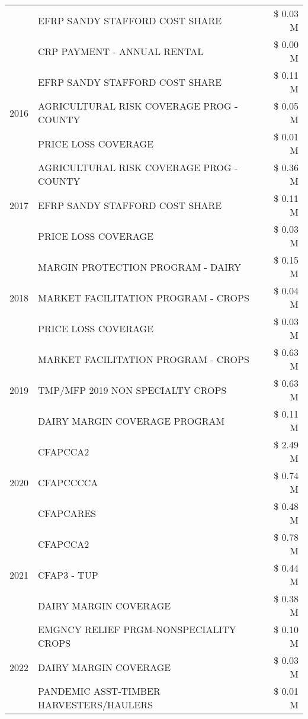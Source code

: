 \begin{tabular}{llr}
 & EFRP SANDY STAFFORD COST SHARE & \$ 0.03 M \\
 & CRP PAYMENT - ANNUAL RENTAL & \$ 0.00 M \\
\cline{1-3}
\multirow[t]{3}{*}{2016} & EFRP SANDY STAFFORD COST SHARE & \$ 0.11 M \\
 & AGRICULTURAL RISK COVERAGE PROG - COUNTY & \$ 0.05 M \\
 & PRICE LOSS COVERAGE & \$ 0.01 M \\
\cline{1-3}
\multirow[t]{3}{*}{2017} & AGRICULTURAL RISK COVERAGE PROG - COUNTY & \$ 0.36 M \\
 & EFRP SANDY STAFFORD COST SHARE & \$ 0.11 M \\
 & PRICE LOSS COVERAGE & \$ 0.03 M \\
\cline{1-3}
\multirow[t]{3}{*}{2018} & MARGIN PROTECTION PROGRAM - DAIRY & \$ 0.15 M \\
 & MARKET FACILITATION PROGRAM - CROPS & \$ 0.04 M \\
 & PRICE LOSS COVERAGE & \$ 0.03 M \\
\cline{1-3}
\multirow[t]{3}{*}{2019} & MARKET FACILITATION PROGRAM - CROPS & \$ 0.63 M \\
 & TMP/MFP 2019 NON SPECIALTY CROPS & \$ 0.63 M \\
 & DAIRY MARGIN COVERAGE PROGRAM & \$ 0.11 M \\
\cline{1-3}
\multirow[t]{3}{*}{2020} & CFAPCCA2 & \$ 2.49 M \\
 & CFAPCCCCA & \$ 0.74 M \\
 & CFAPCARES & \$ 0.48 M \\
\cline{1-3}
\multirow[t]{3}{*}{2021} & CFAPCCA2 & \$ 0.78 M \\
 & CFAP3 - TUP & \$ 0.44 M \\
 & DAIRY MARGIN COVERAGE & \$ 0.38 M \\
\cline{1-3}
\multirow[t]{3}{*}{2022} & EMGNCY RELIEF PRGM-NONSPECIALITY CROPS & \$ 0.10 M \\
 & DAIRY MARGIN COVERAGE & \$ 0.03 M \\
 & PANDEMIC ASST-TIMBER HARVESTERS/HAULERS & \$ 0.01 M \\
\cline{1-3}
\bottomrule
\end{tabular}
